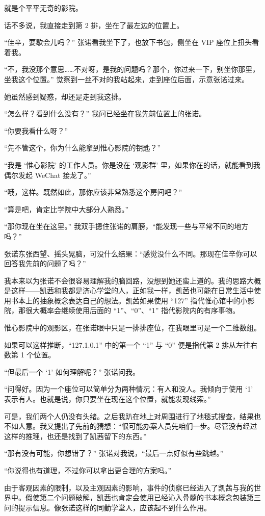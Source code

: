 \documentclass[UTF8]{ctexart}
\begin{document}
就是个平平无奇的影院。

话不多说，我直接走到第 2 排，坐在了最左边的位置上。

“佳辛，要歇会儿吗？” 张诺看我坐下了，也放下书包，侧坐在 VIP 座位上扭头看着我。

“不，我没那个意思……不对呀，是我的问题吗？那个，你过来一下，别坐你那里，坐我这个位置。” 觉察到一丝不对的我站起来，走到座位后面，示意张诺过来。

她虽然感到疑惑，却还是走到我这排。

“怎么样？看到什么没有？” 我问已经坐在我先前位置上的张诺。

“你要我看什么呀？”

“先不管这个，你为什么能拿到惟心影院的钥匙？”

“我是 ‘惟心影院’ 的工作人员。你是没在 ‘观影群’ 里，如果你在的话，就能看到我偶尔发起 WeChat 接龙了。”

“哦，这样。既然如此，那你应该非常熟悉这个房间吧？”

“算是吧，肯定比学院中大部分人熟悉。”

“那你现在坐在这里。” 我双手摁住张诺的肩膀，“能发现一些与平常不同的地方吗？”

张诺东张西望、摇头晃脑，可没什么结果：“感觉没什么不同。那现在佳辛你可以回答我先前的问题了吗？”

我本来以为张诺不会很容易理解我的脑回路，没想到她还蛮上道的。我的思路大概是这样——凯茜和我都是济心学堂的人，正如我一样，凯茜也可能在日常生活中使用书本上的抽象概念表达自己的想法。凯茜如果使用 “127” 指代惟心馆中的小影院，那很大概率会继续使用后面的 “1”、“0”、“1” 指代影院内的有序事物。

惟心影院中的观影区，在张诺眼中只是一排排座位，在我眼里可是一个二维数组。

如果可以这样推断，“127.1.0.1” 中的第一个 “1” 与 “0” 便是指代第 2 排从左往右数第 1 个位置。

“但最后一个 ‘1’ 如何理解呢？” 张诺问我。

“问得好。因为一个座位可以简单分为两种情况：有人和没人。我倾向于使用 ‘1’ 表示有人。也就是说，你只要坐在现在这个位置，就能发现线索。”

可是，我们两个人仍没有头绪。之后我趴在地上对周围进行了地毯式搜查，结果也不如人意。我又提出了先前的猜想：“很可能办案人员先咱们一步。尽管没有经过这样的推理，也还是找到了凯茜留下的东西。”

“那有没有可能，你想错了？” 张诺对我说，“最后一点好似有些跳越。”

“你说得也有道理，不过你可以拿出更合理的方案吗。”

由于客观因素的限制，以及主观因素的影响，事件的侦察已经进入了凯茜与我的世界中。假使第二个问题破解，凯茜也肯定会使用已经沁入骨髓的书本概念包装第三问的提示信息。像张诺这样的同勤学堂人，应该起不到什么作用。
\end{document}
